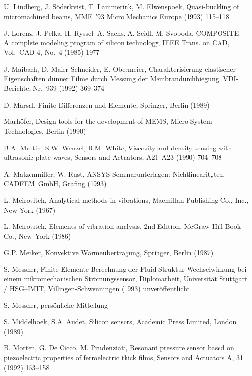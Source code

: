 \begin{thebibliography}{xxx}
 U. Lindberg, J. Söderkvist, T. Lammerink, M. Elwenspoek, Quasi-buckling of
 micromachined beams, MME~'93 Micro Mechanics Europe (1993) 115--118

 J. Lorenz, J. Pelka, H. Ryssel, A. Sachs, A. Seidl, M. Svoboda,
 {\sf COMPOSITE} -- A complete modeling program of silicon technology,
 IEEE Trans. on CAD, Vol.~CAD-4, No.~4 (1985) 1977

 J. Maibach, D. Maier-Schneider, E. Obermeier, Charakterisierung elastischer
 Eigenschaften dünner Filme durch Messung der Membrandurchbiegung,
 VDI-Berichte, Nr.~939 (1992) 369--374

 D. Marsal, Finite Differenzen und Elemente, Springer, Berlin (1989)

 Marhöfer, Design tools for the development of MEMS, Micro System
 Technologies, Berlin (1990)

 B.A. Martin, S.W. Wenzel, R.M. White, Viscosity and density sensing with
 ultrasonic plate waves, Sensors and Actuators, A21--A23 (1990) 704--708

 A. Matzenmiller, W. Rust, {\sf ANSYS}-Seminarunterlagen: Nichtlinearit„ten,
 CADFEM~GmbH, Grafing (1993)

 L. Meirovitch, Analytical methods in vibrations, Macmillan Publishing Co.,
 Inc., New York (1967)

 L. Meirovitch, Elements of vibration analysis, 2nd Edition, McGraw-Hill
 Book Co., New~York (1986)

 G.P. Merker, Konvektive Wärmeübertragung, Springer, Berlin (1987)

 S. Messner, Finite-Elemente Berechnung der Fluid-\-Struktur-\-Wechselwirkung
 bei einem mikromechanischen Strömungssensor, Diplomarbeit,
 Universität Stuttgart / HSG--IMIT, Villingen-Schwenningen (1993)
 unveröffentlicht

 S. Messner, persönliche Mitteilung

 S. Middelhoek, S.A. Audet, Silicon sensors, Academic Press Limited,
 London (1989)

 B. Morten, G. De Cicco, M. Prudenziati, Resonant pressure sensor based on
 piezoelectric properties of ferroelectric thick films, Sensors and
 Actuators A, 31 (1992) 153--158


\end{thebibliography}
